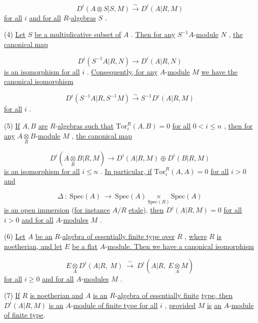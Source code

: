 $$D^i(A\otimes S|S, M) \xrightarrow{\sim} D^i(A|R, M)$$
\underline{for all}  $i$  \underline{and for all} $R$-\underline{algebras}  $S$  .

(4)  \underline{Let}  $S$  \underline{be a multiplicative subset of}  $A$  . \underline{Then for any}  $S^{-1}A$-\underline{module} $N$  , \underline{the canonical map}

$$D^i(S^{-1}A|R, N) \to D^i(A|R, N)$$
\underline{is an isomorphism for all}  $i$  . \underline{Consequently, for any} $A$-\underline{module}  $M$  \underline{we have the} \underline{canonical isomorphism}

$$D^i(S^{-1}A|R, S^{-1}M) \xrightarrow{\sim} S^{-1}D^i(A|R, M)$$
\underline{for all}  $i$  .

(5)  \underline{If}  $A, B$  \underline{are} $R$-\underline{algebras such that}  $\mathrm{Tor}_i^R(A, B) = 0$  \underline{for all} $0 < i \leq n$  , \underline{then for any}  $A\underset{R}{\otimes}B$-\underline{module}  $M$  , \underline{the canonical map}

$$D^i(A\underset{R}{\otimes}B|R, M) \to D^i(A|R, M) \oplus D^i(B|R, M)$$
\underline{is an isomorphism for all}  $i \leq n$  . \underline{In particular, if}  $\mathrm{Tor}_i^R(A, A) = 0$  \underline{for all}
$i > 0$  \underline{and}

\begin{equation*}
\Delta \ : \ \mathrm{Spec}(A) \ \to \ \mathrm{Spec}(A) \underset{\mathrm{Spec}(R)}{\times} \mathrm{Spec}(A)
\end{equation*}
\underline{is an open immersion} (\underline{for instance}  $A/R$  \underline{etale}), \underline{then}  $D^i(A|R, M) = 0$  \underline{for all} $i > 0$  \underline{and for all} $A$-\underline{modules}  $M$ .

(6) \underline{Let}  $A$  \underline{be an} $R$-\underline{algebra of essentially finite type over}  $R$ , \underline{where} $R$  \underline{is noetherian, and let}  $E$  \underline{be a flat} $A$-\underline{module. Then we have a canonical isomorphism}

\begin{equation*}
E \underset{A}{\otimes} D^i(A|R, \ M) \ \overset{\sim}{\longrightarrow} \ D^i(A|R, \ E \underset{A}{\otimes} M)
\end{equation*}
\underline{for all}  $i \geq 0$  \underline{and for all} $A$-\underline{modules}  $M$ .

(7) \underline{If}  $R$  \underline{is noetherian and}  $A$  \underline{is an} $R$-\underline{algebra of essentially finite} \underline{type, then}  $D^i(A|R, M)$  \underline{is an} $A$-\underline{module of finite type for all}  $i$ , \underline{provided}  $M$  \underline{is} \underline{an} $A$-\underline{module of finite type}.

